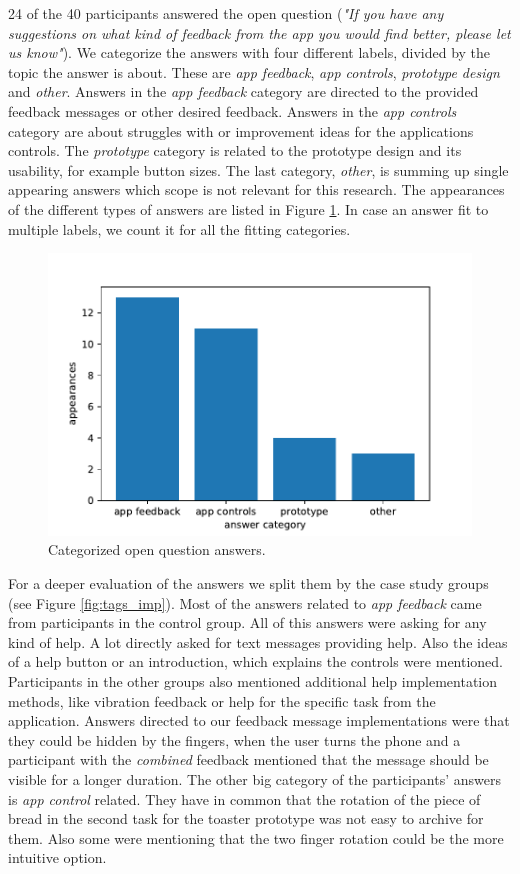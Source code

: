 \documentclass[11pt, a4paper]{article}
\begin{document}
			24 of the 40 participants answered the open question (\emph{"If you have any suggestions on what kind of feedback from the app you would find better, please let us know"}). We categorize the answers with four different labels, divided by the topic the answer is about. These are \emph{app feedback}, \emph{app controls}, \emph{prototype design} and \emph{other}. Answers in the \emph{app feedback} category are directed to the provided feedback messages or other desired feedback. Answers in the \emph{app controls} category are about struggles with or improvement ideas for the applications controls. The \emph{prototype} category is related to the prototype design and its usability, for example button sizes. The last category, \emph{other}, is summing up single appearing answers which scope is not relevant for this research. The appearances of the different types of answers are listed in Figure \ref{fig:tags}. In case an answer fit to multiple labels, we count it for all the fitting categories.

			\begin{figure}[H]
				\centering
				\includegraphics[width=.49\textwidth]{img/plot/plot_tags.pdf}
				\caption{Categorized open question answers.}
				\label{fig:tags}
			\end{figure}
			
			For a deeper evaluation of the answers we split them by the case study groups (see Figure \ref{fig:tags_imp}). 
			Most of the answers related to \emph{app feedback} came from participants in the control group. All of this answers were asking for any kind of help. A lot directly asked for text messages providing help. Also the ideas of a help button or an introduction, which explains the controls were mentioned. Participants in the other groups also mentioned additional help implementation methods, like vibration feedback or help for the specific task from the application. Answers directed to our feedback message implementations were that they could be hidden by the fingers, when the user turns the phone and a participant with the \emph{combined} feedback mentioned that the message should be visible for a longer duration. The other big category of the participants' answers is \emph{app control} related. They have in common that the rotation of the piece of bread in the second task for the toaster prototype was not easy to archive for them. Also some were mentioning that the two finger rotation could be the more intuitive option.
\end{document}
